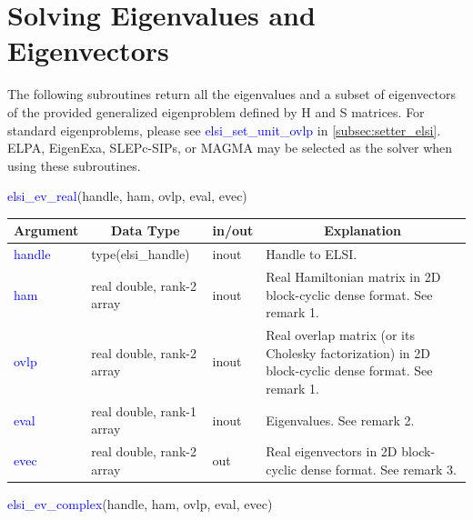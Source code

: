\documentclass{report}
\newcommand{\tcb}[1]{\textcolor{blue}{#1}}
\begin{document}
\section{Solving Eigenvalues and Eigenvectors}
\label{sec:ev}
The following subroutines return all the eigenvalues and a subset of eigenvectors of the provided generalized eigenproblem defined by H and S matrices. For standard eigenproblems, please see \tcb{elsi\_set\_unit\_ovlp} in \ref{subsec:setter_elsi}. ELPA, EigenExa, SLEPc-SIPs, or MAGMA may be selected as the solver when using these subroutines.
\begin{labeling}{\hspace{6cm}}
\item [\hspace{0.3cm} \tcb{elsi\_ev\_real}(handle, ham, ovlp, eval, evec)]
\end{labeling}

\begin{tabular}[]{|p{20mm}|p{45mm}|p{15mm}|p{85mm}|}
\hline
\multicolumn{1}{|c|}{\textbf{Argument}} & \multicolumn{1}{c|}{\textbf{Data Type}} & \multicolumn{1}{c|}{\textbf{in/out}} & \multicolumn{1}{c|}{\textbf{Explanation}}\\
\hline
\tcb{handle} & type(elsi\_handle)        & inout & Handle to ELSI.\\
\hline
\tcb{ham}    & real double, rank-2 array & inout & Real Hamiltonian matrix in 2D block-cyclic dense format. See remark 1.\\
\hline
\tcb{ovlp}   & real double, rank-2 array & inout & Real overlap matrix (or its Cholesky factorization) in 2D block-cyclic dense format. See remark 1.\\
\hline
\tcb{eval}   & real double, rank-1 array & inout & Eigenvalues. See remark 2.\\
\hline
\tcb{evec}   & real double, rank-2 array & out   & Real eigenvectors in 2D block-cyclic dense format. See remark 3.\\
\hline
\end{tabular}

\begin{labeling}{\hspace{6cm}}
\item [\hspace{0.3cm} \tcb{elsi\_ev\_complex}(handle, ham, ovlp, eval, evec)]
\end{labeling}
\end{document}
